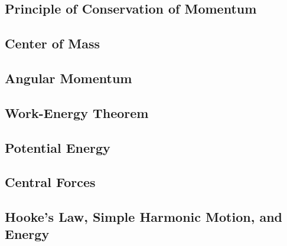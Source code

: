 \documentclass{article}
\begin{document}
\subsection{Principle of Conservation of Momentum}



\subsection{Center of Mass}



\subsection{Angular Momentum}



\subsection{Work-Energy Theorem}



\subsection{Potential Energy}



\subsection{Central Forces}



\subsection{Hooke's Law, Simple Harmonic Motion, and Energy}

\end{document}

